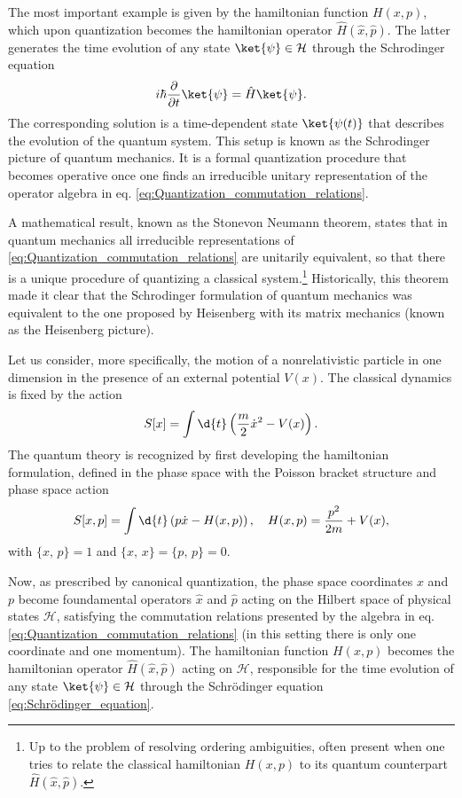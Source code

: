 The most important example is given by the hamiltonian function \(H(x,p)\), which upon quantization becomes the hamiltonian operator \(\hat{H} (\hat{x} ,\hat{p})\). The latter generates the time evolution of any state \(\ket{\psi} \in \mathcal{H}\) through the Schrodinger equation
\begin{equation}
    i\hbar \frac{\partial}{\partial t} \ket{\psi} = \hat{H} \ket{\psi}.
    \label{eq:Schrödinger_equation}
\end{equation}
The corresponding solution is a time-dependent state \(\ket{\psi(t)}\) that describes the evolution of the quantum system. This setup is known as the Schrodinger picture of quantum mechanics. It is a formal quantization procedure that becomes operative once one finds an irreducible unitary representation of the operator algebra in eq. \eqref{eq:Quantization_commutation_relations}.

A mathematical result, known as the Stonevon Neumann theorem, states that in quantum mechanics all irreducible representations of \eqref{eq:Quantization_commutation_relations} are unitarily equivalent, so that there is a unique procedure of quantizing a classical system.\footnote{Up to the problem of resolving ordering ambiguities, often present when one tries to relate the classical hamiltonian \(H(x,p)\) to its quantum counterpart \(\hat{H} (\hat{x} ,\hat{p})\).}
Historically, this theorem made it clear that the Schrodinger formulation of quantum mechanics was equivalent to the one proposed by Heisenberg with its matrix mechanics (known as the Heisenberg picture).

Let us consider, more specifically, the motion of a nonrelativistic particle in one dimension in the presence of an external potential \(V(x)\). The classical dynamics is fixed by the action
\[
    S[x] = \int \d{t} \left( \frac{m}{2} \dot{x}^2 - V(x) \right).
\]
The quantum theory is recognized by first developing the hamiltonian formulation, defined in the phase space with the Poisson bracket structure and phase space action
\[
    S[x,p] = \int \d{t} \left( p \dot{x} - H(x,p) \right), \quad H(x,p) = \frac{p^2}{2m} + V(x),
\]
with \(\{x,\,p\}=1\) and \(\{x,\,x\}=\{p,\,p\}=0\).

Now, as prescribed by canonical quantization, the phase space coordinates \(x\) and \(p\) become foundamental operators \(\hat{x}\) and \(\hat{p}\) acting on the Hilbert space of physical states \(\mathcal{H}\), satisfying the commutation relations presented by the algebra in eq. \eqref{eq:Quantization_commutation_relations} (in this setting there is only one coordinate and one momentum). The hamiltonian function \(H(x,p)\) becomes the hamiltonian operator \(\hat{H} (\hat{x} ,\hat{p})\) acting on \(\mathcal{H}\), responsible for the time evolution of any state \(\ket{\psi} \in \mathcal{H}\) through the Schrödinger equation \eqref{eq:Schrödinger_equation}.

